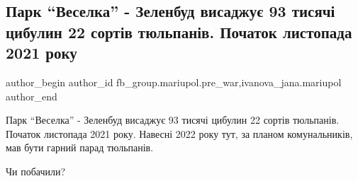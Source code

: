  
 
 
 
 

\subsection{Парк \enquote{Веселка} - Зеленбуд висаджує 93 тисячі цибулин 22 сортів тюльпанів. Початок листопада 2021 року}
\label{sec:19_02_2023.fb.fb_group.mariupol.pre_war.1.park__veselka____zel}
 
\ifcmt
 author_begin
   author_id fb_group.mariupol.pre_war,ivanova_jana.mariupol
 author_end
\fi

Парк \enquote{Веселка} - Зеленбуд висаджує 93 тисячі цибулин 22 сортів тюльпанів.
Початок листопада 2021 року. Навесні 2022 року тут, за планом комунальників,
мав бути гарний парад тюльпанів. 

Чи побачили?

